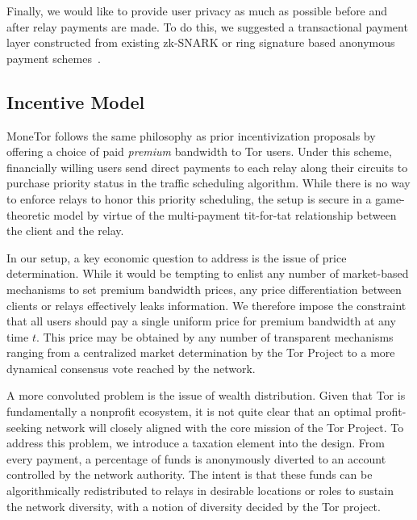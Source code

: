 Finally, we would like to provide user privacy as much as possible before and
after relay payments are made. To do this, we suggested a transactional payment
layer constructed from existing zk-SNARK or ring signature based anonymous
payment schemes~\cite{sasson2014zerocash, van2013cryptonote}.

\subsection{Incentive Model}
MoneTor follows the same philosophy as prior incentivization proposals by
offering a choice of paid \emph{premium} bandwidth to Tor users. Under this
scheme, financially willing users send direct payments to each relay along their
circuits to purchase priority status in the traffic scheduling
algorithm. While there is no way to enforce relays to honor this priority
scheduling, the setup is secure in a game-theoretic model by virtue of the
multi-payment tit-for-tat relationship between the client and the relay.

In our setup, a key economic question to address is the issue of price
determination. While it would be tempting to enlist any number of market-based
mechanisms to set premium bandwidth prices, any price differentiation between
clients or relays effectively leaks information. We therefore impose the
constraint that all users should pay a single uniform price for
premium bandwidth at any time $t$. This price may be obtained by any number of
transparent mechanisms ranging from a centralized market determination by the
Tor Project to a more dynamical consensus vote reached by the network.

A more convoluted problem is the issue of wealth distribution. Given that Tor is
fundamentally a nonprofit ecosystem, it is not quite clear that an optimal
profit-seeking network will closely aligned with the core mission of the Tor
Project. To address this problem, we introduce a taxation element into the
design. From every payment, a percentage of funds is anonymously diverted to an
account controlled by the network authority. The intent is that these funds can
be algorithmically redistributed to relays in desirable locations or roles to sustain the network diversity, with a notion of diversity decided by the Tor project.